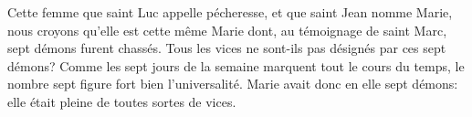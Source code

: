 Cette femme que saint Luc appelle pécheresse, et que saint Jean nomme Marie,
	nous croyons qu’elle est cette même Marie
	dont, au témoignage de saint Marc, sept démons furent chassés.
Tous les vices ne sont-ils pas désignés par ces sept démons?
	Comme les sept jours de la semaine marquent tout le cours du temps,
	le nombre sept figure fort bien l’universalité.
Marie avait donc en elle sept démons:
	elle était pleine de toutes sortes de vices.
